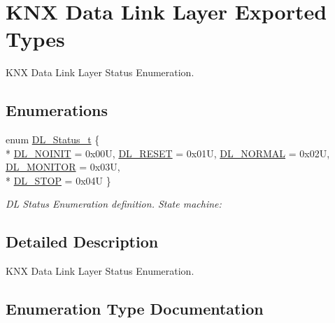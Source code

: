 \hypertarget{group___k_n_x___d_l___exported___types}{}\section{K\+NX Data Link Layer Exported Types}
\label{group___k_n_x___d_l___exported___types}


K\+NX Data Link Layer Status Enumeration.  


\subsection*{Enumerations}
\begin{DoxyCompactItemize}
\item 
enum \hyperlink{group___k_n_x___d_l___exported___types_ga143539be3680d9b7f990a9dfe1df40fe}{D\+L\+\_\+\+Status\+\_\+t} \{ \\*
\hyperlink{group___k_n_x___d_l___exported___types_gga143539be3680d9b7f990a9dfe1df40fea969d86c8adec3c545ea39159d7dedc7f}{D\+L\+\_\+\+N\+O\+I\+N\+IT} = 0x00U, 
\hyperlink{group___k_n_x___d_l___exported___types_gga143539be3680d9b7f990a9dfe1df40fea80e6219a436df0a34c8533186c5e44c2}{D\+L\+\_\+\+R\+E\+S\+ET} = 0x01U, 
\hyperlink{group___k_n_x___d_l___exported___types_gga143539be3680d9b7f990a9dfe1df40fea461c81727c49b6e32e3caf88887d53bd}{D\+L\+\_\+\+N\+O\+R\+M\+AL} = 0x02U, 
\hyperlink{group___k_n_x___d_l___exported___types_gga143539be3680d9b7f990a9dfe1df40feab460a3cda55e265ecedd269d942e1ef0}{D\+L\+\_\+\+M\+O\+N\+I\+T\+OR} = 0x03U, 
\\*
\hyperlink{group___k_n_x___d_l___exported___types_gga143539be3680d9b7f990a9dfe1df40fea46083fdde5108543c09e29c2c2659cb6}{D\+L\+\_\+\+S\+T\+OP} = 0x04U
 \}\begin{DoxyCompactList}\small\item\em DL Status Enumeration definition. State machine\+: \end{DoxyCompactList}
\end{DoxyCompactItemize}


\subsection{Detailed Description}
K\+NX Data Link Layer Status Enumeration. 



\subsection{Enumeration Type Documentation}
